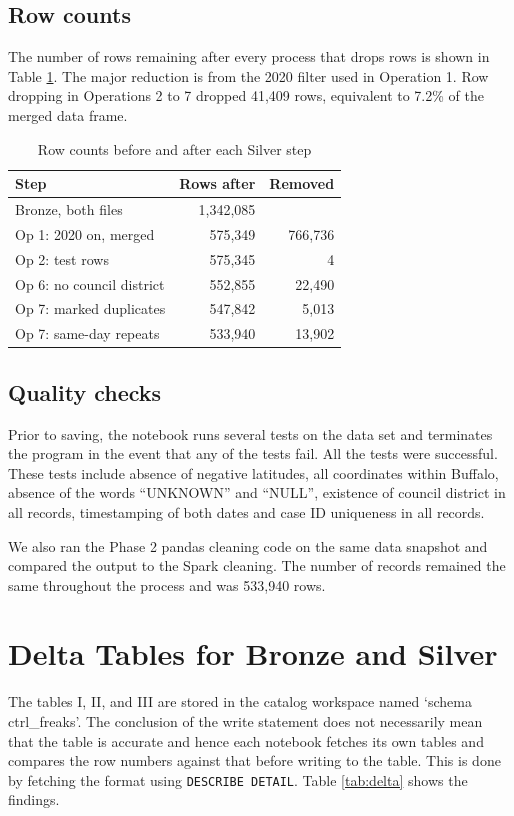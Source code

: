 \documentclass[conference]{IEEEtran}
\begin{document}
\subsection{Row counts}
The number of rows remaining after every process that drops rows is shown in Table \ref{tab:rows}. The major reduction is from the 2020 filter used in Operation 1. Row dropping in Operations 2 to 7 dropped 41,409 rows, equivalent to 7.2\% of the merged data frame.

\begin{table}[h]
\centering
\caption{Row counts before and after each Silver step}
\label{tab:rows}
\begin{tabular}{lrr}
\toprule
Step & Rows after & Removed \\
\midrule
Bronze, both files & 1,342,085 & \\
Op 1: 2020 on, merged & 575,349 & 766,736 \\
Op 2: test rows & 575,345 & 4 \\
Op 6: no council district & 552,855 & 22,490 \\
Op 7: marked duplicates & 547,842 & 5,013 \\
Op 7: same-day repeats & 533,940 & 13,902 \\
\bottomrule
\end{tabular}
\end{table}

\subsection{Quality checks}
Prior to saving, the notebook runs several tests on the data set and terminates the program in the event that any of the tests fail. All the tests were successful. These tests include absence of negative latitudes, all coordinates within Buffalo, absence of the words ``UNKNOWN'' and ``NULL'', existence of council district in all records, timestamping of both dates and case ID uniqueness in all records.

We also ran the Phase 2 pandas cleaning code on the same data snapshot and compared the output to the Spark cleaning. The number of records remained the same throughout the process and was 533,940 rows.

\section{Delta Tables for Bronze and Silver}
The tables I, II, and III are stored in the catalog workspace named `schema ctrl\_freaks'. The conclusion of the write statement does not necessarily mean that the table is accurate and hence each notebook fetches its own tables and compares the row numbers against that before writing to the table. This is done by fetching the format using \texttt{DESCRIBE DETAIL}. Table \ref{tab:delta} shows the findings.
\end{document}
